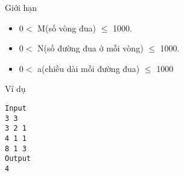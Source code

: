 Giới hạn  
\begin{itemize}
	\item     0$<$ M(số vòng đua)  $\le$ 1000.   
	\item     0$<$ N(số đường đua ở mỗi vòng) $\le$ 1000.   
	\item     0$<$ a(chiều dài mỗi đường đua) $\le$ 1000   
\end{itemize}
   Ví dụ  
\begin{verbatim}
Input
3 3
3 2 1
4 1 1
8 1 3
Output
4
\end{verbatim}